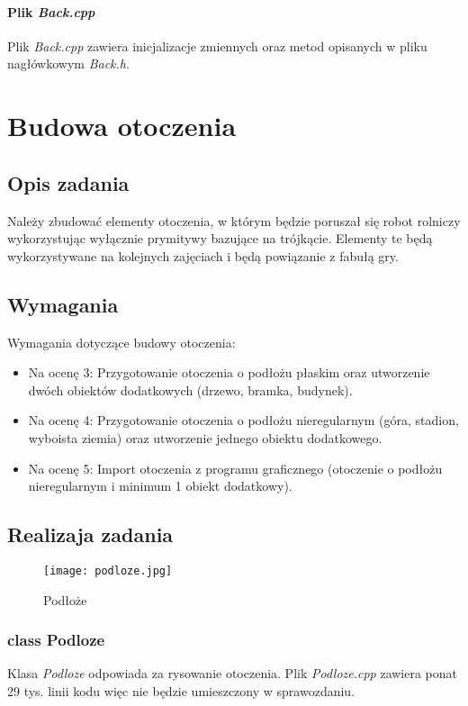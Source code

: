 \documentclass[a4paper, 12pt]{report}
\begin{document}
\subsubsection{Plik \emph{Back.cpp}}
Plik \emph{Back.cpp} zawiera inicjalizacje zmiennych oraz metod opisanych w pliku nagłówkowym \emph{Back.h}.


\chapter{Budowa otoczenia}
\section{Opis zadania}
Należy zbudować elementy otoczenia, w którym będzie poruszał się robot rolniczy wykorzystując wyłącznie prymitywy bazujące na trójkącie. Elementy te będą wykorzystywane na kolejnych zajęciach i będą powiązanie z fabułą gry.
\section{Wymagania}
Wymagania dotyczące budowy otoczenia:
\begin{itemize}
\item Na ocenę 3: Przygotowanie otoczenia o podłożu płaskim oraz utworzenie dwóch obiektów dodatkowych (drzewo, bramka, budynek).
\item Na ocenę 4: Przygotowanie otoczenia o podłożu nieregularnym (góra, stadion, wyboista ziemia) oraz utworzenie jednego obiektu dodatkowego.
\item Na ocenę 5: Import otoczenia z programu graficznego (otoczenie o podłożu nieregularnym i minimum 1 obiekt dodatkowy).
\end{itemize}

\section{Realizaja zadania}

\begin{figure}
		\centering
		\texttt{[image: podloze.jpg]}
		\caption{Podłoże}
\end{figure}

\subsection{class Podloze}

Klasa \emph{Podloze} odpowiada za rysowanie otoczenia. Plik \emph{Podloze.cpp} zawiera ponat 29 tys. linii kodu więc nie będzie umieszczony w sprawozdaniu.
\end{document}
